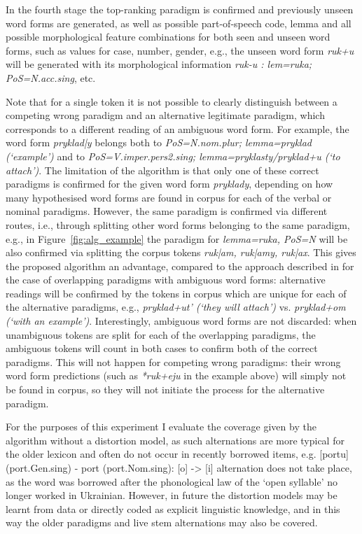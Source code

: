 \documentclass[11pt,a4paper]{article}
\begin{document}
In the fourth stage the top-ranking paradigm is confirmed and previously unseen word forms are generated, as well as possible part-of-speech code, lemma and all possible morphological feature combinations for both seen and unseen word forms, such as values for case, number, gender, e.g., the unseen word form \emph{ruk+u} will be generated with its morphological information \emph{ruk-u : lem=ruka; PoS=N.acc.sing}, etc.

Note that for a single token it is not possible to clearly distinguish between a competing wrong paradigm and an alternative legitimate paradigm, which corresponds to a different reading of an ambiguous word form. For example, the word form \emph{pryklad|y} belongs both to \emph{PoS=N.nom.plur; lemma=pryklad (`example')} and to \emph{PoS=V.imper.pers2.sing; lemma=pryklasty/pryklad+u (`to attach')}. The limitation of the algorithm is that only one of these correct paradigms is confirmed for the given word form \emph{pryklady}, depending on how many hypothesised word forms are found in corpus for each of the verbal or nominal paradigms. However, the same paradigm is confirmed via different routes, i.e., through splitting other word forms belonging to the same paradigm, e.g., in Figure~\ref{fig:alg_example} the paradigm for \emph{lemma=ruka, PoS=N} will be also confirmed via splitting the corpus tokens \emph{ruk|am, ruk|amy, ruk|ax}. This gives the proposed algorithm an advantage, compared to the approach described in \cite{ahlberg2015paradigm} for the case of overlapping paradigms with ambiguous word forms: alternative readings will be confirmed by the tokens in corpus which are unique for each of the alternative paradigms, e.g., \emph{pryklad+ut' (`they will attach')} vs. \emph{pryklad+om (`with an example')}. Interestingly, ambiguous word forms are not discarded: when unambiguous tokens are split for each of the overlapping paradigms, the ambiguous tokens will count in both cases to confirm both of the correct paradigms. This will not happen for competing wrong paradigms: their wrong word form predictions (such as \emph{*ruk+eju} in the example above)  will simply not be found in corpus, so they will not initiate the process for the alternative paradigm.

For the purposes of this experiment I evaluate the coverage given by the algorithm without a distortion model, as such alternations are more typical for the older lexicon and often do not occur in recently borrowed items, e.g. [portu] (port.Gen.sing) - port (port.Nom.sing): [o] -> [i] alternation does not take place, as the word was borrowed after the phonological law of the `open syllable' no longer worked in Ukrainian. However, in future the distortion models may be learnt from data or directly coded as explicit linguistic knowledge, and in this way the older paradigms and live stem alternations may also be covered.
\end{document}
